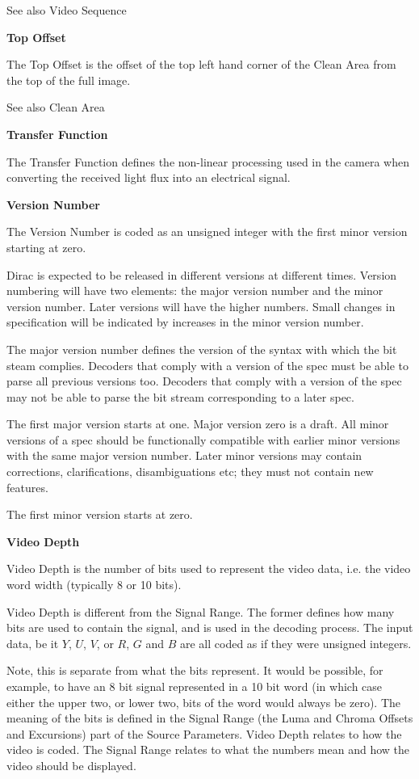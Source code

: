 See also Video Sequence

\textbf{Top Offset}

The Top Offset is the offset of the top left hand corner of the Clean
Area from the top of the full image.

See also Clean Area

\textbf{Transfer Function}

The Transfer Function defines the non-linear processing used in the
camera when converting the received light flux into an electrical
signal.

\textbf{Version Number}

The Version Number is coded as an unsigned integer with the first minor
version starting at zero.

Dirac is expected to be released in different versions at different
times. Version numbering will have two elements: the major version
number and the minor version number. Later versions will have the higher
numbers. Small changes in specification will be indicated by increases
in the minor version number.

The major version number defines the version of the syntax with which
the bit steam complies. Decoders that comply with a version of the spec
must be able to parse all previous versions too. Decoders that comply
with a version of the spec may not be able to parse the bit stream
corresponding to a later spec.

The first major version starts at one. Major version zero is a draft.
All minor versions of a spec should be functionally compatible with
earlier minor versions with the same major version number. Later minor
versions may contain corrections, clarifications, disambiguations etc;
they must not contain new features.

The first minor version starts at zero.

\textbf{Video Depth}

Video Depth is the number of bits used to represent the video data, i.e.
the video word width (typically 8  or 10 bits).

Video Depth is different from the Signal Range. The former defines how
many bits are used to contain the signal, and is used in the decoding
process. The input data, be it $Y$, $U$, $V$, or $R$, $G$ and $B$ are
all coded as if they were unsigned integers.

Note, this is separate from what the bits represent. It would be
possible, for example, to have an 8 bit signal represented in a 10 bit
word (in which case either the upper two, or lower two, bits of the word
would always be zero). The meaning of the bits is defined in the Signal
Range (the Luma and Chroma Offsets and Excursions) part of the Source
Parameters. Video Depth relates to how the video is coded. The Signal
Range relates to what the numbers mean and how the video should be
displayed.

